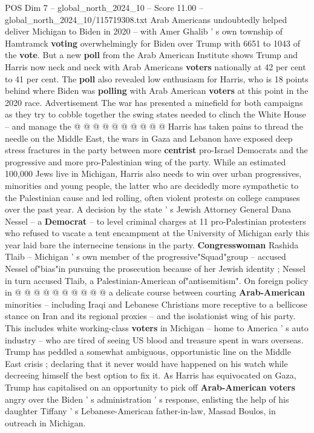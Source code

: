 \begin{textsample}{POS Dim 7 – global\_north\_2024\_10 – Score 11.00 – global\_north\_2024\_10/115719308.txt}
Arab Americans undoubtedly helped deliver Michigan to Biden in 2020 -- with Amer Ghalib ' s own township of Hamtramck \textbf{voting} overwhelmingly for Biden over Trump with 6651 to 1043 of the \textbf{vote}.
But a new \textbf{poll} from the Arab American Institute shows Trump and Harris now neck and neck with Arab Americans \textbf{voters} nationally at 42 per cent to 41 per cent.
The \textbf{poll} also revealed low enthusiasm for Harris, who is 18 points behind where Biden was \textbf{polling} with Arab American \textbf{voters} at this point in the 2020 race.
Advertisement The war has presented a minefield for both campaigns as they try to cobble together the swing states needed to clinch the White House -- and manage the @ @ @ @ @ @ @ @ @ @ Harris has taken pains to thread the needle on the Middle East, the wars in Gaza and Lebanon have exposed deep stress fractures in the party between more \textbf{centrist} pro-Israel Democrats and the progressive and more pro-Palestinian wing of the party.
While an estimated 100,000 Jews live in Michigan, Harris also needs to win over urban progressives, minorities and young people, the latter who are decidedly more sympathetic to the Palestinian cause and led rolling, often violent protests on college campuses over the past year.
A decision by the state ' s Jewish Attorney General Dana Nessel -- a \textbf{Democrat} -- to level criminal charges at 11 pro-Palestinian protesters who refused to vacate a tent encampment at the University of Michigan early this year laid bare the internecine tensions in the party. \textbf{Congresswoman} Rashida Tlaib -- Michigan ' s own member of the progressive"Squad"group -- accused Nessel of"bias"in pursuing the prosecution because of her Jewish identity ; Nessel in turn accused Tlaib, a Palestinian-American of"antisemitism".
On foreign policy in @ @ @ @ @ @ @ @ @ @ a delicate course between courting \textbf{Arab-American} minorities -- including Iraqi and Lebanese Christians more receptive to a bellicose stance on Iran and its regional proxies -- and the isolationist wing of his party.
This includes white working-class \textbf{voters} in Michigan -- home to America ' s auto industry -- who are tired of seeing US blood and treasure spent in wars overseas.
Trump has peddled a somewhat ambiguous, opportunistic line on the Middle East crisis ; declaring that it never would have happened on his watch while decreeing himself the best option to fix it.
As Harris has equivocated on Gaza, Trump has capitalised on an opportunity to pick off \textbf{Arab-American} \textbf{voters} angry over the Biden ' s administration ' s response, enlisting the help of his daughter Tiffany ' s Lebanese-American father-in-law, Massad Boulos, in outreach in Michigan.

\end{textsample}
